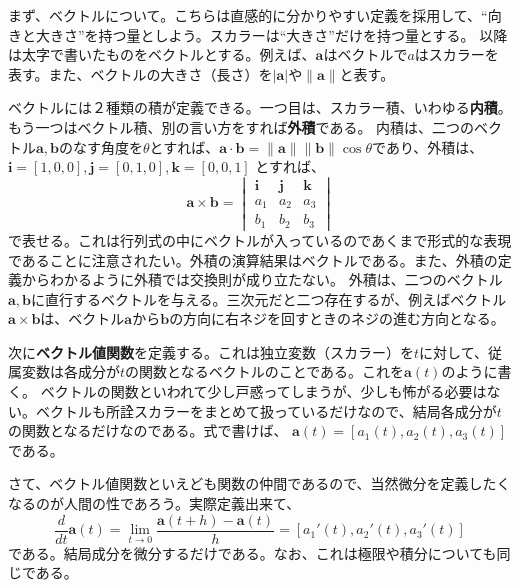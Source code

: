 \documentclass[a4j,dvipdfmx]{jsarticle}
\begin{document}
            まず、ベクトルについて。こちらは直感的に分かりやすい定義を採用して、``向きと大きさ''を持つ量としよう。スカラーは``大きさ''だけを持つ量とする。
            以降は太字で書いたものをベクトルとする。例えば、$\bm{a}$はベクトルで$a$はスカラーを表す。また、ベクトルの大きさ（長さ）を$|\bm{a}|$や$\|\bm{a}\|$と表す。

            ベクトルには２種類の積が定義できる。一つ目は、スカラー積、いわゆる\textbf{内積}。もう一つはベクトル積、別の言い方をすれば\textbf{外積}である。
            内積は、二つのベクトル$\bm{a},\bm{b}$のなす角度を$\theta$とすれば、$\bm{a}\cdot\bm{b}=\|\bm{a}\|\|\bm{b}\|\cos\theta$であり、外積は、$\bm{i}=[1,0,0],\bm{j}=[0,1,0],\bm{k}=[0,0,1]$
            とすれば、
            \begin{equation}
                \bm{a}\times \bm{b} = 
                \begin{vmatrix}
                    \bm{i} & \bm{j} & \bm{k} \\
                    a_1 & a_2 & a_3 \\
                    b_1 & b_2 & b_3
                    \end{vmatrix}                    
            \end{equation}
            で表せる。これは行列式の中にベクトルが入っているのであくまで形式的な表現であることに注意されたい。外積の演算結果はベクトルである。また、外積の定義からわかるように外積では交換則が成り立たない。
            外積は、二つのベクトル$\bm{a},\bm{b}$に直行するベクトルを与える。三次元だと二つ存在するが、例えばベクトル
            $\bm{a}\times \bm{b}$は、ベクトル$\bm{a}$から$\bm{b}$の方向に右ネジを回すときのネジの進む方向となる。

            次に\textbf{ベクトル値関数}を定義する。これは独立変数（スカラー）を$t$に対して、従属変数は各成分が$t$の関数となるベクトルのことである。これを$\bm{a}(t)$のように書く。
            ベクトルの関数といわれて少し戸惑ってしまうが、少しも怖がる必要はない。ベクトルも所詮スカラーをまとめて扱っているだけなので、結局各成分が$t$の関数となるだけなのである。式で書けば、
            $\bm{a}(t)=[a_1(t),a_2(t),a_3(t)]$である。

            さて、ベクトル値関数といえども関数の仲間であるので、当然微分を定義したくなるのが人間の性であろう。実際定義出来て、
            \begin{equation}
                \frac{d}{dt}\bm{a}(t)=\lim_{t\to 0}\frac{\bm{a}(t+h)-\bm{a}(t)}{h}=[a_1'(t),a_2'(t),a_3'(t)]
            \end{equation}
            である。結局成分を微分するだけである。なお、これは極限や積分についても同じである。
\end{document}
